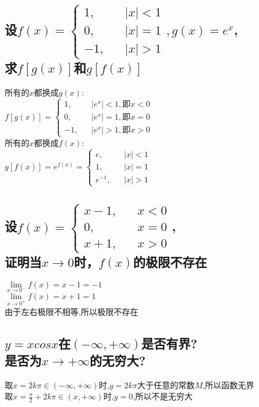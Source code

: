 \documentclass{article}
\begin{document}
\begin{flushleft}
	\subsection{
	设$f(x)=\left\{
	\begin{array}{rcl}
	1, & & |x|<1\\
	0, & & |x|=1\\
	-1, & & |x|>1
	\end{array} \right.,g(x)=e^x$,\\
	求$f[g(x)]$和$g[f(x)]$
	}
	所有的$x$都换成$g(x)$:\\
	$f[g(x)]=\left\{
	\begin{array}{rcl}
	1, & & |e^x|<1,\mbox{即}x<0\\
	0, & & |e^x|=1,\mbox{即}x=0\\
	-1, & & |e^x|>1,\mbox{即}x>0
	\end{array} \right.$\\
	所有的$x$都换成$f(x)$:\\
	$g[f(x)]=e^{f(x)}=\left\{
	\begin{array}{rcl}
	e, & & |x|<1\\
	1, & & |x|=1\\
	e^{-1}, & & |x|>1
	\end{array} \right.$\\
	
	\subsection{
	设$f(x)=\left\{
	\begin{array}{rcl}
	x-1, & & x<0\\
	0, & & x=0\\
	x+1, & & x>0
	\end{array} \right.$,\\
	证明当$x\to 0$时，$f(x)$的极限不存在
	}
	$\lim\limits_{x\to 0^-}f(x)=x-1=-1$\\
	$\lim\limits_{x\to 0^+}f(x)=x+1=1$\\
	由于左右极限不相等,所以极限不存在\\
	
	\subsection{
	$y=xcosx$在$(-\infty,+\infty)$是否有界?\\
	是否为$x\to +\infty$的无穷大?
	}
	取$x=2k\pi\in(-\infty,+\infty)$时,$y=2k\pi$大于任意的常数$M$,所以函数无界\\
	取$x=\frac{\pi}{2}+2k\pi\in(x,+\infty)$时,$y=0$,所以不是无穷大\\
	
\end{flushleft}
\end{document}
